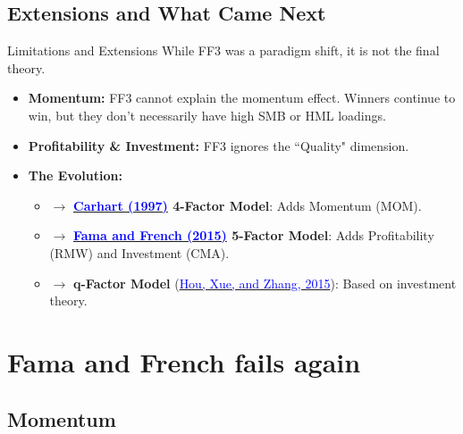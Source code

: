 \documentclass{beamer}
\begin{document}
\subsection{Extensions and What Came Next}

\begin{frame}{Limitations and Extensions}
	While FF3 was a paradigm shift, it is not the final theory.
	
	\begin{itemize}
		\item \textbf{Momentum:} FF3 cannot explain the momentum effect. Winners continue to win, but they don't necessarily have high SMB or HML loadings.
		\item \textbf{Profitability \& Investment:} FF3 ignores the ``Quality" dimension.
		\item \textbf{The Evolution:}
		\begin{itemize}
			\item $\rightarrow$ \textbf{\href{https://doi.org/10.1111/j.1540-6261.1997.tb03808.x}{\textcolor{blue}{Carhart (1997)}} 4-Factor Model}: Adds Momentum (MOM).
			\item $\rightarrow$ \textbf{\href{https://doi.org/10.1016/j.jfineco.2014.10.010}{\textcolor{blue}{Fama and French (2015)}} 5-Factor Model}: Adds Profitability (RMW) and Investment (CMA).
			\item $\rightarrow$ \textbf{q-Factor Model} (\href{https://doi.org/10.1093/rfs/hhu068}{\textcolor{blue}{Hou, Xue, and Zhang, 2015}}): Based on investment theory.
		\end{itemize}
	\end{itemize}
\end{frame}


\section{Fama and French fails again}

\subsection{Momentum}
\end{document}
